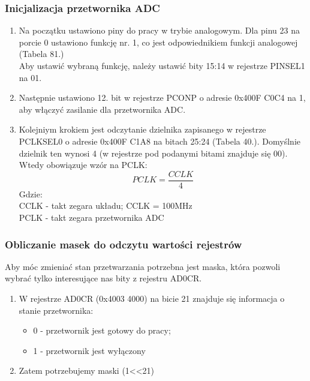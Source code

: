 \documentclass{article}
\begin{document}
\subsubsection{Inicjalizacja przetwornika ADC}
    \begin{enumerate}
        \item Na początku ustawiono piny do pracy w trybie analogowym. Dla pinu 23 na porcie 0 ustawiono funkcję nr. 1, co jest odpowiednikiem funkcji analogowej (Tabela 81.) \\%
              Aby ustawić wybraną funkcję, należy ustawić bity 15:14 w rejestrze PINSEL1 na 01.
        \item Następnie ustawiono 12. bit w rejestrze PCONP o adresie 0x400F C0C4 na 1, aby włączyć zasilanie dla przetwornika ADC.
        \item Kolejniym krokiem jest odczytanie dzielnika zapisanego w rejestrze PCLKSEL0 o adresie 0x400F C1A8 na bitach 25:24 (Tabela 40.). Domyślnie dzielnik ten wynosi 4 (w rejestrze pod podanymi bitami znajduje się 00). Wtedy obowiązuje wzór na PCLK:
        \[
        PCLK = \frac{CCLK}{4}
        \]
        Gdzie:\\
        CCLK - takt zegara układu; CCLK = 100MHz\\
        PCLK - takt zegara przetwornika ADC\\
        
    \end{enumerate}

\subsubsection{Obliczanie masek do odczytu wartości rejestrów}
        Aby móc zmieniać stan przetwarzania potrzebna jest maska, która pozwoli wybrać tylko interesujące nas bity z rejestru AD0CR.
        \begin{enumerate}
            \item W rejestrze AD0CR (0x4003 4000) na bicie 21 znajduje się informacja o stanie przetwornika:
            \begin{itemize}
                \item 0 - przetwornik jest gotowy do pracy;
                \item 1 - przetwornik jest wyłączony
            \end{itemize}
            \item Zatem potrzebujemy maski (1<<21)
        \end{enumerate}
\end{document}
